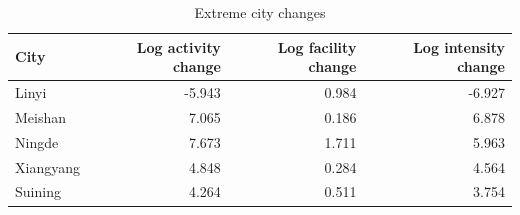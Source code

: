 \begin{table}[htbp]\centering\small
\caption{Extreme city changes}\label{tab:map_extremes}
\begin{tabular}{@{}lrrr@{}}
\toprule
City & Log activity change & Log facility change & Log intensity change \\\midrule
Linyi & -5.943 & 0.984 & -6.927 \\
Meishan & 7.065 & 0.186 & 6.878 \\
Ningde & 7.673 & 1.711 & 5.963 \\
Xiangyang & 4.848 & 0.284 & 4.564 \\
Suining & 4.264 & 0.511 & 3.754 \\
\bottomrule\end{tabular}
\end{table}
